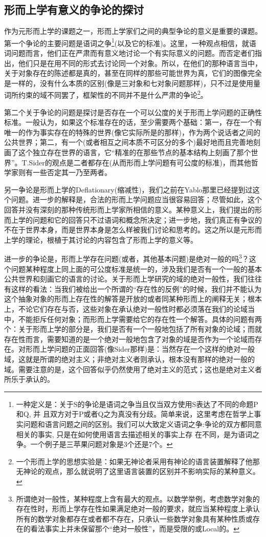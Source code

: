 \documentclass{article}
\begin{document}
\subsection{形而上学有意义的争论的探讨}
作为元形而上学的课题之一，形而上学家们之间的典型争论的意义是重要的课题。第一个争论的主要问题是语词之争\footnote{一种定义是：关于S的争论是语词之争当且仅当双方使用S表达了不同的命题P和Q, 并 且双方对于P或者Q之为真没有分歧。简单来说，这里考虑在哲学上事实问题和语言问题之间的区别。我们可以大致定义语词之争:争论的双方都同意相关的事实, 只是在如何使用语言去描述相关的事实上存 在不同，是为语词之争。一个例子是三苹果问题对象是3个还是7个。}(以及它的标准)。这里，一种观点相信，就语词问题而言，他们正在严肃而有意义地讨论一个有实际意义的问题。而否定者们指出，他们只是在用不同的形式去讨论同一个对象。所以，在他们的那种语言当中，关于对象存在的陈述都是真的，甚至在同样的那些可能世界为真，它们的图像完全是一样的，没有什么本质的区别(像是三对象和七对象问题那样)，只不过是使用量词所约束的域不同罢了，框架性的不同并不是什么严肃的争论\footnote{一个形而上学的思想实验是：如果无神论者采用有神论的语言装置解释了他那无神论的观点，那么就说明了这里语言装置的区别并不影响实际的某种意义。}。

第二个关于争论的问题是探讨是否存在一个可以公度的关于形而上学问题的正确性标准。一般认为，如果这个标准存在的话，至少需要两个基础：第一，存在一个有唯一的作为事实存在的特殊的世界(像它实际所是的那样)，作为两个说话者之间的公共世界；第二，有一个(或者相互之间本质不可区分的多个)最好地而且完善地刻画了这个独立存在世界的语言，它“精准的在那些节点的基本结构上刻画了那个世界”。T.Sider的观点是二者都存在(从而形而上学问题有可公度的标准)，而其他哲学家则有一些否定其一乃至两者。

另一争论是形而上学的Deflationary(缩减性)，我们之前在Yablo那里已经提到过这个问题。进一步的解释是，合法的形而上学问题应当很容易回答；尽管如此，这个回答并没有深刻的那种传统形而上学家所相信的意义。某种意义上，我们提出的形而上学的问题和它的回答只不过语词和概念所决定；进一步地，我们真正有争议的不在于世界本身，而是世界本身是怎么样被我们讨论和思考的。这之所以是元形而上学的理论，根植于其讨论的内容包含了形而上学的意义等。

进一步的争论是，形而上学存在问题(或者，其他基本问题)是绝对一般的吗\footnote{所谓绝对一般性，某种程度上含有最大的观点。以数学举例，考虑数学对象的存在性时，形而上学存在性如果满足绝对一般的要求，就应当某种程度上承认所有的数学对象都存在或者都不存在，只承认一些数学对象具有某种性质或存在的看法事实上并未保留那个“绝对一般性”，而是受限的或Local的。}？这个问题某种程度上同上面的可公度标准是统一的，涉及我们是否有一个一般的基本公共世界和刻画它的语言的讨论。关于形而上学研究的域的绝对一般性，我们往往有这样的看法：当我们被给出一个所谓的“存在性的反例”的时候，我们并不能认为这个抽象对象的形而上存在性的解答是开放的或者同某种形而上的阐释无关；根本上，不论它们存在与否，这些对象在承认绝对一般性时都必须落在我们的论域当中，不能拒斥任何对象；而形而上学需要给它的存在性一个解答。具体的问题有两个：关于形而上学的部分是，我们是否有一个一般地包括了所有对象的论域；而就存在性而言，需要知道的是一个绝对一般地包含了对象的域是否作为一个论域而存在。对形而上学问题的正面回答(像Sider那样)是：当然存在一个这样的绝对一般域，这就是所谓的绝对主义；非绝对主义者则承认，根本没有那样的绝对一般的域。需要注意的是，这个回答似乎仍然使用了绝对主义的范式；这也是绝对主义者所乐于承认的。
\end{document}
